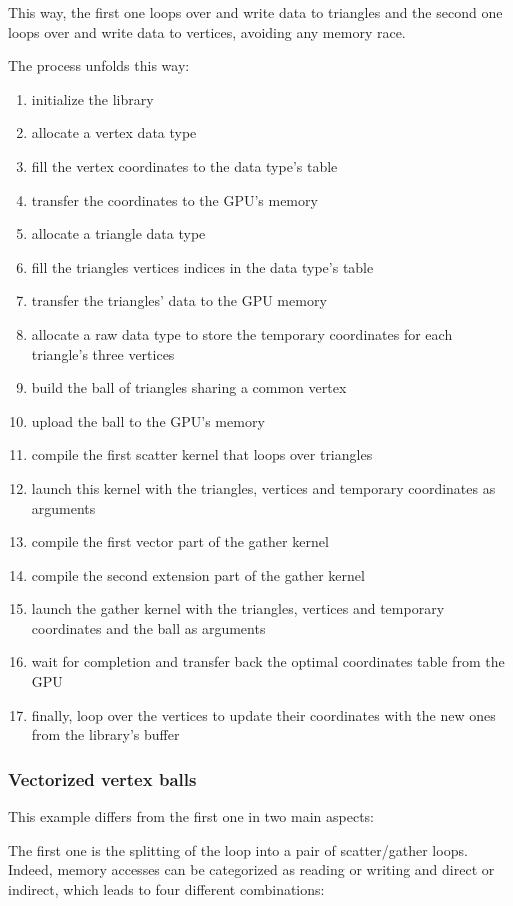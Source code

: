 \documentclass[a4paper,12pt]{article}
\begin{document}
This way, the first one loops over and write data to triangles and the second one loops over and write data to vertices, avoiding any memory race.

The process unfolds this way:
\begin{enumerate}
\item initialize the library
\item allocate a vertex data type
\item fill the vertex coordinates to the data type's table
\item transfer the coordinates to the GPU's memory
\item allocate a triangle data type
\item fill the triangles vertices indices in the data type's table
\item transfer the triangles' data to the GPU memory
\item allocate a raw data type to store the temporary coordinates for each triangle's three vertices
\item build the ball of triangles sharing a common vertex
\item upload the ball to the GPU's memory
\item compile the first scatter kernel that loops over triangles
\item launch this kernel with the triangles, vertices and temporary coordinates as arguments
\item compile the first vector part of the gather kernel
\item compile the second extension part of the gather kernel
\item launch the gather kernel with the triangles, vertices and temporary coordinates and the ball as arguments
\item wait for completion and transfer back the optimal coordinates table from the GPU
\item finally, loop over the vertices to update their coordinates with the new ones from the library's buffer
\end{enumerate}

\subsubsection{Vectorized vertex balls}
This example differs from the first one in two main aspects:

The first one is the splitting of the loop into a pair of scatter/gather loops.
Indeed, memory accesses can be categorized as reading or writing and direct or indirect, which leads to four different combinations:
\end{document}
